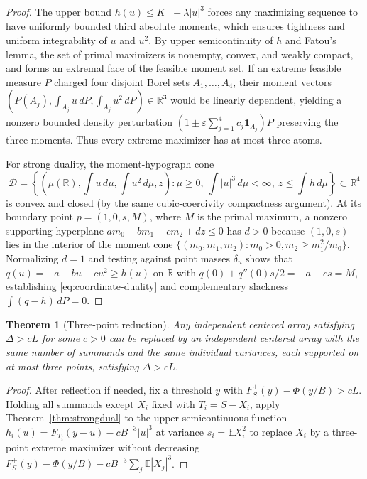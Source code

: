 \documentclass[11pt]{article}
\numberwithin{equation}{section}
\newtheorem{theorem}{Theorem}[section]
\theoremstyle{definition}
\theoremstyle{remark}
\newcommand{\E}{\mathbb E}
\newcommand{\R}{\mathbb R}
\newcommand{\ind}{\mathbf 1}
\newcommand{\eps}{\varepsilon}
\begin{document}
\begin{proof}
The upper bound $h(u)\le K_+-\lambda|u|^3$ forces any maximizing sequence to
have uniformly bounded third absolute moments, which ensures tightness and
uniform integrability of $u$ and $u^2$. By upper semicontinuity of $h$ and
Fatou's lemma, the set of primal maximizers is nonempty, convex, and weakly
compact, and forms an extremal face of the feasible moment set. If an extreme
feasible measure $P$ charged four disjoint Borel sets $A_1,\ldots,A_4$, their
moment vectors $(P(A_j),\int_{A_j}u\,dP,\int_{A_j}u^2\,dP)\in\R^3$ would be
linearly dependent, yielding a nonzero bounded density perturbation
$(1\pm\eps\sum_{j=1}^4c_j\ind_{A_j})P$ preserving the three moments. Thus
every extreme maximizer has at most three atoms.

For strong duality, the moment-hypograph cone
\[
 \mathcal D=\left\{\left(\mu(\R),\int u\,d\mu,\int u^2\,d\mu,z\right):
 \mu\ge0,\ \int|u|^3\,d\mu<\infty,\ z\le\int h\,d\mu\right\}\subset\R^4
\]
is convex and closed (by the same cubic-coercivity compactness argument). At
its boundary point $p=(1,0,s,M)$, where $M$ is the primal maximum, a nonzero
supporting hyperplane $am_0+bm_1+cm_2+dz\le0$ has $d>0$ because $(1,0,s)$ lies
in the interior of the moment cone $\{(m_0,m_1,m_2):m_0>0,m_2\ge m_1^2/m_0\}$.
Normalizing $d=1$ and testing against point masses $\delta_u$ shows that
$q(u)=-a-bu-cu^2\ge h(u)$ on $\R$ with $q(0)+q''(0)s/2=-a-cs=M$, establishing
\eqref{eq:coordinate-duality} and complementary slackness $\int(q-h)\,dP=0$.
\end{proof}

\begin{samepage}
\begin{theorem}[Three-point reduction]\label{thm:threepoint}
Any independent centered array satisfying $\Delta>c L$ for some $c>0$ can be
replaced by an independent centered array with the same number of summands
and the same individual variances, each supported on at most three points,
satisfying $\Delta>c L$.
\end{theorem}
\end{samepage}
\begin{proof}
After reflection if needed, fix a threshold $y$ with $F_S^+(y)-\Phi(y/B)>cL$.
Holding all summands except $X_i$ fixed with $T_i=S-X_i$, apply
Theorem~\ref{thm:strongdual} to the upper semicontinuous function
$h_i(u)=F_{T_i}^+(y-u)-cB^{-3}|u|^3$ at variance $s_i=\E X_i^2$ to replace
$X_i$ by a three-point extreme maximizer without decreasing
$F_S^+(y)-\Phi(y/B)-cB^{-3}\sum_j\E|X_j|^3$.
\end{proof}
\end{document}
